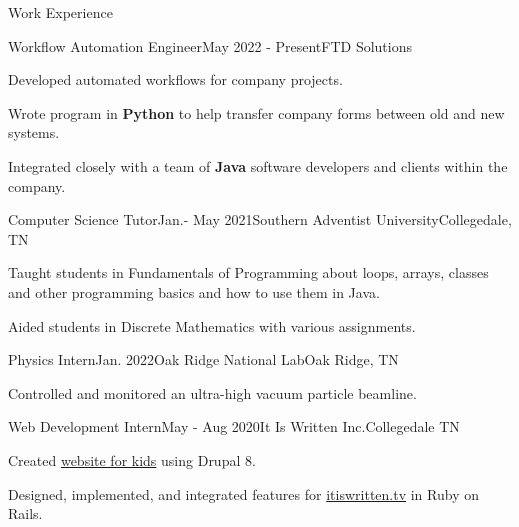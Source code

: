 \begin{rSection}{Work Experience}
	\begin{job}{Workflow Automation Engineer}{May 2022 - Present}{FTD Solutions}{}
		\item Developed automated workflows for company projects.
		\item Wrote program in {\bf Python} to help transfer company forms between old and new systems.
		\item Integrated closely with a team of {\bf Java} software developers and clients within the company.
	\end{job}
	
	\begin{job}{Computer Science Tutor}{Jan.- May 2021}{Southern Adventist University}{Collegedale, TN}
	 \item Taught students in Fundamentals of Programming about loops, arrays, classes and other programming basics and how to use them in Java.
	 \item Aided students in Discrete Mathematics with various assignments.
	\end{job}

	\begin{job}{Physics Intern}{Jan. 2022}{Oak Ridge National Lab}{Oak Ridge, TN}
	 \item Controlled and monitored an ultra-high vacuum particle beamline.
	\end{job}

	\begin{job}{Web Development Intern}{May - Aug 2020}{It Is Written Inc.}{Collegedale TN}
		\item Created \href{https://buriedtreasure.fun/}{website for kids} using Drupal 8.
		\item Designed, implemented, and integrated features for \href{https://itiswritten.tv}{itiswritten.tv} in Ruby on Rails.
	\end{job}
\end{rSection}